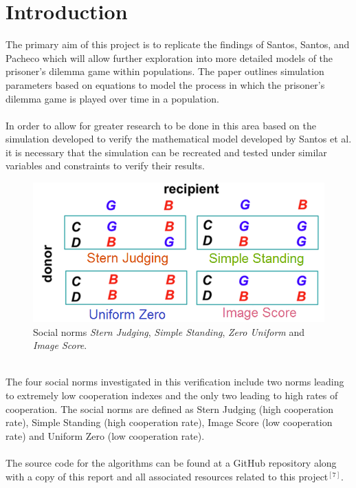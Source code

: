 \documentclass[10pt,a4paper]{article}
\begin{document}
\section{Introduction}
The primary aim of this project is to replicate the findings of Santos, Santos, and Pacheco which will allow further exploration into more detailed models of the prisoner’s dilemma game within populations. The paper outlines simulation parameters based on equations to model the process in which the prisoner’s dilemma game is played over time in a population. 
\\\\
In order to allow for greater research to be done in this area based on the simulation developed to verify the mathematical model developed by Santos et al. it is necessary that the simulation can be recreated and tested under similar variables and constraints to verify their results.
\begin{figure}
  \includegraphics[width=\linewidth]{Images/social_norms.PNG}
  \caption{Social norms \textit{Stern Judging}, \textit{Simple Standing}, \textit{Zero Uniform} and \textit{Image Score}.}
  \label{fig:Runtime1}
\end{figure}
\\
The four social norms investigated in this verification include two norms leading to extremely low cooperation indexes and the only two leading to high rates of cooperation.
The social norms are defined as Stern Judging (high cooperation rate), Simple Standing (high cooperation rate), Image Score (low cooperation rate) and Uniform Zero (low cooperation rate).
\\\\
The source code for the algorithms can be found at a GitHub repository along with a copy of this report and all associated resources related to this project$^{[7]}$.
\end{document}
